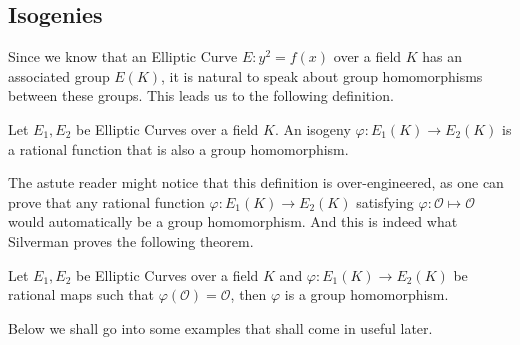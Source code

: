 \subsection{Isogenies}%
\label{sub:isogenies}
Since we know that an Elliptic Curve $E: y^2 = f(x)$ over a
field $K$ has an associated group $E(K)$, it is natural
to speak about group homomorphisms between these groups.
This leads us to the following definition.
\begin{definition} \label{def:isogeny}
  Let $E_1, E_2$ be Elliptic Curves over a field $K$.
  An isogeny $\varphi: E_1(K) \to E_2(K)$ is a rational function
  that is also a group homomorphism.
\end{definition}
The astute reader might notice that this definition is
over-engineered, as one can prove that any rational function
$\varphi: E_1(K) \to E_2(K)$ satisfying $\varphi: \mathcal{O} \mapsto \mathcal{O}$
would automatically be a group homomorphism. And this is indeed what
Silverman proves \cite[Theorem III.4.8]{silvermanRationalPoints}
the following theorem.
\begin{theorem} \label{thm:rationalMapsAreIsogeny}
  Let $E_1, E_2$ be Elliptic Curves over a field $K$
  and $\varphi: E_1(K) \to E_2(K)$ be rational maps
  such that $\varphi(\mathcal{O}) = \mathcal{O}$,
  then $\varphi$ is a group homomorphism.
\end{theorem}
Below we shall go into some examples
that shall come in useful later.
